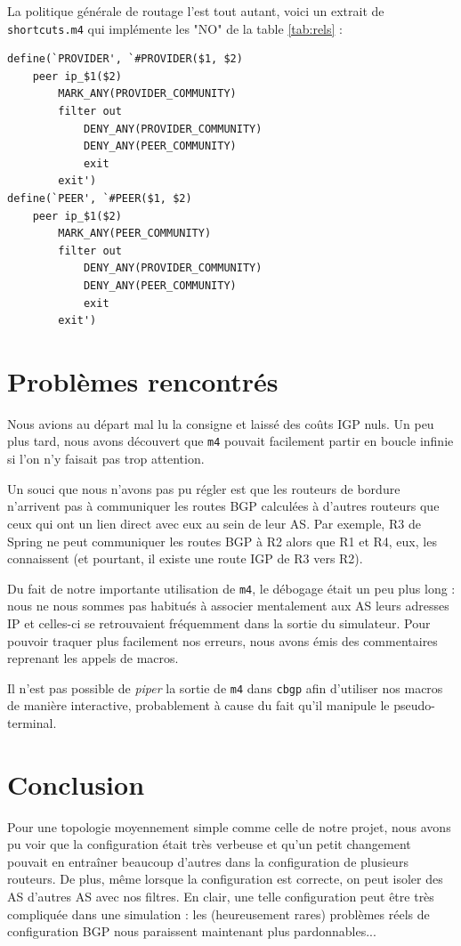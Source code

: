 \documentclass[10pt,a4paper,twocolumn]{article}
\begin{document}
La politique générale de routage l'est tout autant, voici un extrait de \texttt{shortcuts.m4} qui implémente les "NO" de la table \ref{tab:rels} :
\begin{verbatim}
define(`PROVIDER', `#PROVIDER($1, $2)
    peer ip_$1($2)
        MARK_ANY(PROVIDER_COMMUNITY)
        filter out
            DENY_ANY(PROVIDER_COMMUNITY)
            DENY_ANY(PEER_COMMUNITY)
            exit
        exit')
define(`PEER', `#PEER($1, $2)
    peer ip_$1($2)
        MARK_ANY(PEER_COMMUNITY)
        filter out
            DENY_ANY(PROVIDER_COMMUNITY)
            DENY_ANY(PEER_COMMUNITY)
            exit
        exit')
\end{verbatim}

\section{Problèmes rencontrés}
Nous avions au départ mal lu la consigne et laissé des coûts IGP nuls. Un peu plus tard, nous avons découvert que \texttt{m4} pouvait facilement partir en boucle infinie si l'on n'y faisait pas trop attention.

Un souci que nous n'avons pas pu régler est que les routeurs de bordure n'arrivent pas à communiquer les routes BGP calculées à d'autres routeurs que ceux qui ont un lien direct avec eux au sein de leur AS.
Par exemple, R3 de Spring ne peut communiquer les routes BGP à R2 alors que R1 et R4, eux, les connaissent (et pourtant, il existe une route IGP de R3 vers R2).

Du fait de notre importante utilisation de \texttt{m4}, le débogage était un peu plus long : nous ne nous sommes pas habitués à associer mentalement aux AS leurs adresses IP et celles-ci se retrouvaient fréquemment dans la sortie du simulateur. Pour pouvoir traquer plus facilement nos erreurs, nous avons émis des commentaires reprenant les appels de macros.

Il n'est pas possible de \textit{piper} la sortie de \texttt{m4} dans \texttt{cbgp} afin d'utiliser nos macros de manière interactive, probablement à cause du fait qu'il manipule le pseudo-terminal.

\section{Conclusion}
Pour une topologie moyennement simple comme celle de notre projet, nous avons pu voir que la configuration était très verbeuse et qu'un petit changement pouvait en entraîner beaucoup d'autres dans la configuration de plusieurs routeurs. De plus,
même lorsque la configuration est correcte, on peut isoler des AS d'autres AS avec nos filtres.
En clair, une telle configuration peut être très compliquée dans une simulation : les (heureusement rares) problèmes réels de configuration BGP nous paraissent maintenant plus pardonnables...
\end{document}
